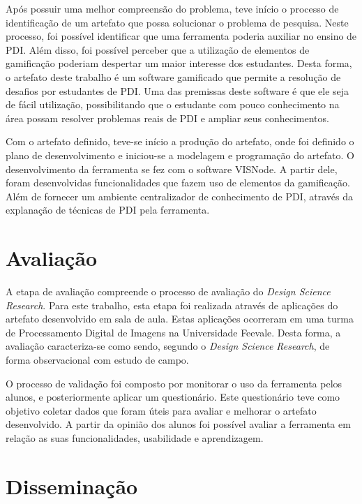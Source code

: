 \documentclass[
	12pt,				%
	oneside,			%
	a4paper,			%
	english,			%
	french,				%
	spanish,			%
	brazil,				%
	]{abntex2}
\begin{document}
Após possuir uma melhor compreensão do problema, teve início o processo de identificação de um artefato que possa solucionar o problema de pesquisa. Neste processo, foi possível identificar que uma ferramenta poderia auxiliar no ensino de PDI. Além disso, foi possível perceber que a utilização de elementos de gamificação poderiam despertar um maior interesse dos estudantes. Desta forma, o artefato deste trabalho é um software gamificado que permite a resolução de desafios por estudantes de PDI. Uma das premissas deste software é que ele seja de fácil utilização, possibilitando que o estudante com pouco conhecimento na área possam resolver problemas reais de PDI e ampliar seus conhecimentos.

Com o artefato definido, teve-se início a produção do artefato, onde foi definido o plano de desenvolvimento e iniciou-se a modelagem e programação do artefato. O desenvolvimento da ferramenta se fez com o software VISNode. A partir dele, foram desenvolvidas funcionalidades que fazem uso de elementos da gamificação. Além de fornecer um ambiente centralizador de conhecimento de PDI, através da explanação de técnicas de PDI pela ferramenta.

\section{Avaliação}

A etapa de avaliação compreende o processo de avaliação do \textit{Design Science Research}. Para este trabalho, esta etapa foi realizada através de aplicações do artefato desenvolvido em sala de aula. Estas aplicações ocorreram em uma turma de Processamento Digital de Imagens na Universidade Feevale. Desta forma, a avaliação caracteriza-se como sendo, segundo o \textit{Design Science Research}, de forma observacional com estudo de campo.

O processo de validação foi composto por monitorar o uso da ferramenta pelos alunos, e posteriormente aplicar um questionário. Este questionário teve como objetivo coletar dados que foram úteis para avaliar e melhorar o artefato desenvolvido. A partir da opinião dos alunos foi possível avaliar a ferramenta em relação as suas funcionalidades, usabilidade e aprendizagem.

\section{Disseminação}
\end{document}

